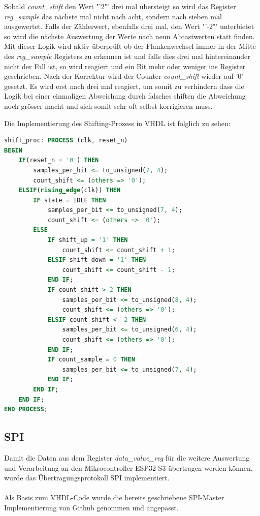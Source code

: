 Sobald \textit{count\_shift} den Wert "'2"' drei mal übersteigt so wird das Register \textit{reg\_sample} das nächste mal nicht nach acht, sondern nach sieben mal ausgewertet. Falls der Zählerwert, ebenfalls drei mal, den Wert "'-2"' unterbietet so wird die nächste Auswertung der Werte nach neun Abtastwerten statt finden. Mit dieser Logik wird aktiv überprüft ob der Flankenwechsel immer in der Mitte des \textit{reg\_sample} Registers zu erkennen ist und falls dies drei mal hintereinander nicht der Fall ist, so wird reagiert und ein Bit mehr oder weniger ins Register geschrieben.
Nach der Korrektur wird der Counter \textit{count\_shift} wieder auf '0' gesetzt. Es wird
erst nach drei mal reagiert, um somit zu verhindern dass die Logik bei einer einmaligen 
Abweichung durch falsches shiften die Abweichung noch grösser macht und sich somit sehr oft
selbst korrigieren muss.

\newpage
Die Implementierung des Shifting-Prozess in VHDL ist folglich zu sehen:

\begin{lstlisting}[language=vhdl]
shift_proc: PROCESS (clk, reset_n)
BEGIN		
	IF(reset_n = '0') THEN
		samples_per_bit <= to_unsigned(7, 4);
		count_shift <= (others => '0');
	ELSIF(rising_edge(clk)) THEN
		IF state = IDLE THEN
			samples_per_bit <= to_unsigned(7, 4);
			count_shift <= (others => '0');
		ELSE	
			IF shift_up = '1' THEN
				count_shift <= count_shift + 1;
			ELSIF shift_down = '1' THEN
				count_shift <= count_shift - 1;
			END IF;
			IF count_shift > 2 THEN
				samples_per_bit <= to_unsigned(8, 4);
				count_shift <= (others => '0');
			ELSIF count_shift < -2 THEN
				samples_per_bit <= to_unsigned(6, 4);
				count_shift <= (others => '0');
			END IF;
			IF count_sample = 0 THEN
				samples_per_bit <= to_unsigned(7, 4);
			END IF;	
		END IF;
	END IF;
END PROCESS;
\end{lstlisting}

\subsection{SPI}
\label{fpga:spi}
Damit die Daten aus dem Register \textit{data\_value\_reg} für die weitere Auswertung und Verarbeitung an den Mikrocontroller ESP32-S3 übertragen werden können, wurde das Übertragungsprotokoll SPI implementiert.\\
\\
Als Basis zum VHDL-Code wurde die bereits geschriebene SPI-Master Implementierung von Github genommen und angepasst. \cite{SPI_git}


